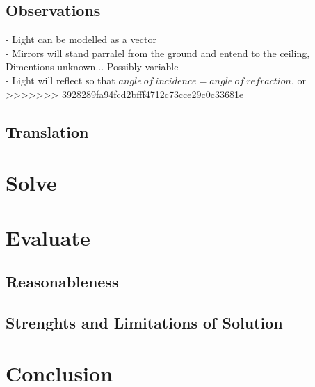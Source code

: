 \documentclass[11pt, letterpaper]{article}
\begin{document}
\subsection{Observations}
\par
- Light can be modelled as a vector
\\
- Mirrors will stand parralel from the ground and entend to the ceiling, Dimentions unknown... Possibly variable
\\
- Light will reflect so that $angle \: of \:incidence = angle \: of \: refraction$, or 
>>>>>>> 3928289fa94fcd2bfff4712c73cce29c0c33681e

\subsection{Translation}


\section{Solve}


\section{Evaluate}



\subsection{Reasonableness}


\subsection{Strenghts and Limitations of Solution}


\section{Conclusion}


 
\end{document}
